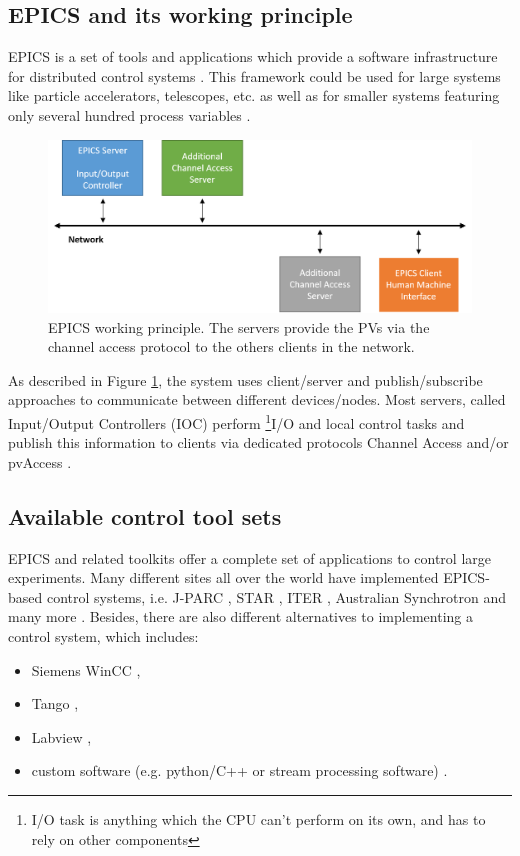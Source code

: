 


\subsection{EPICS and its working principle} 
\label{EPICS}
EPICS is a set of tools and applications which provide a software infrastructure for distributed control systems \cite{EPICS_license}. This framework could be used for large systems like particle accelerators, telescopes, etc. as well as for smaller systems featuring only several hundred process variables \cite{EPICS_1, EPICS_2, EPICS_3, EPICS_4}.
\begin{figure}[!h]
\centering
\includegraphics[width=0.7\columnwidth]{Chapter3/Controls/images/EPICS.png}
\caption{EPICS working principle. The servers provide the \glspl{PV} via the channel access protocol to the others clients in the network.}
\label{fig_EPICS}
\end{figure}

As described in Figure \ref{fig_EPICS}, the system uses client/server and publish/subscribe approaches to communicate between different devices/nodes. Most servers, called Input/Output Controllers (\gls{IOC}) perform \footnote{ I/O task is anything which the CPU can't perform on its own, and has to rely on other components}{I/O} and local control tasks and publish this information to clients via dedicated protocols Channel Access and/or pvAccess \cite{EPICS}. 

 \subsection{Available control tool sets}
 EPICS and related toolkits offer a complete set of applications to control large experiments. Many different sites all over the world have implemented \gls{EPICS}-based control systems, i.e. \gls{J-PARC} \cite{J-PARC}, \gls{STAR} \cite{STAR}, \gls{ITER} \cite{ITER}, Australian Synchrotron and many more \cite{EPICS_site}. Besides, there are also different alternatives to implementing a control system, which includes: 
 \begin{itemize}
     \item Siemens WinCC \cite{Camacho:2022fxa,Goralczyk:2022udx},
     \item Tango \cite{Santander-Vela:2021tma},
     \item Labview \cite{State:2022qlw},
     \item custom software (e.g. python/C++ or stream processing software) \cite{taurus}.
 \end{itemize} 
 
